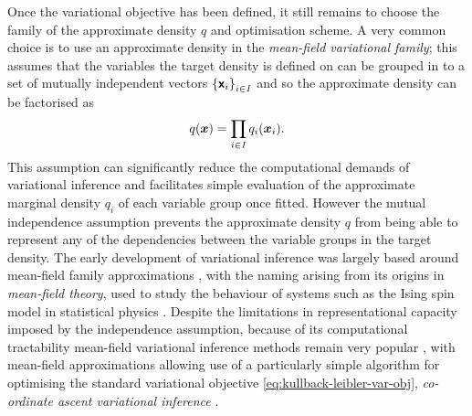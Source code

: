 Once the variational objective has been defined, it still remains to choose the family of the approximate density $q$ and optimisation scheme. 
A very common choice is to use an approximate density in the \emph{mean-field variational family}; this assumes that the variables the target density is defined on can be grouped in to a set of mutually independent vectors $\fset{\rvct{x}_i}_{i\in\set{I}}$ and so the approximate density can be factorised as
\begin{equation}\label{eq:mean-field-variational-family}
  q(\boldsymbol{x}) = \prod_{i\in\mathit{I}} q_i(\boldsymbol{x}_i).
\end{equation}
This assumption can significantly reduce the computational demands of variational inference and facilitates simple evaluation of the approximate marginal density $q_{i}$ of each variable group once fitted. However the mutual independence assumption prevents the approximate density $q$ from being able to represent any of the dependencies between the variable groups in the target density. The early development of variational inference was largely based around mean-field family approximations \citep{peterson1987mean,saul1996mean}, with the naming arising from its origins in \emph{mean-field theory}, used to study the behaviour of systems such as the Ising spin model in statistical physics \citep{parisi1998statistical}. Despite the limitations in representational capacity imposed by the independence assumption, because of its computational tractability mean-field variational inference methods remain very popular \citep{blei2017variational}, with mean-field approximations allowing use of a particularly simple algorithm for optimising the standard variational objective \eqref{eq:kullback-leibler-var-obj}, \emph{co-ordinate ascent variational inference} \citep{bishop2006pattern,blei2017variational}.


